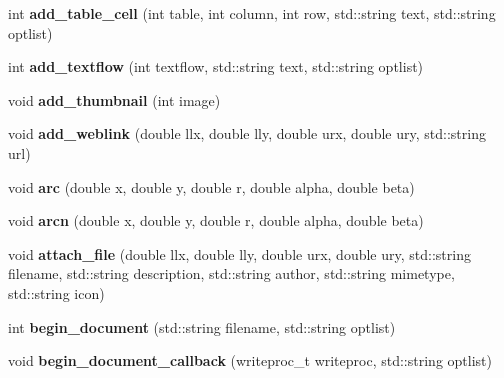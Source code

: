 \begin{DoxyCompactItemize}
\item 
\hypertarget{classPDFlib_a153ce04a9c160a24d13763f8ba6578fa}{int {\bfseries add\-\_\-table\-\_\-cell} (int table, int column, int row, std\-::string text, std\-::string optlist)}\label{classPDFlib_a153ce04a9c160a24d13763f8ba6578fa}

\item 
\hypertarget{classPDFlib_a44f52fd96b6152a2b4ae4f71cebcf36b}{int {\bfseries add\-\_\-textflow} (int textflow, std\-::string text, std\-::string optlist)}\label{classPDFlib_a44f52fd96b6152a2b4ae4f71cebcf36b}

\item 
\hypertarget{classPDFlib_a7561fadef64e392f98d047d5b6e79946}{void {\bfseries add\-\_\-thumbnail} (int image)}\label{classPDFlib_a7561fadef64e392f98d047d5b6e79946}

\item 
\hypertarget{classPDFlib_afdba46325698218399dda4b415204edd}{void {\bfseries add\-\_\-weblink} (double llx, double lly, double urx, double ury, std\-::string url)}\label{classPDFlib_afdba46325698218399dda4b415204edd}

\item 
\hypertarget{classPDFlib_aee884c54b243c01230926f493f06eaf9}{void {\bfseries arc} (double x, double y, double r, double alpha, double beta)}\label{classPDFlib_aee884c54b243c01230926f493f06eaf9}

\item 
\hypertarget{classPDFlib_a061eb6bb4e041c52547cf9d58416ddac}{void {\bfseries arcn} (double x, double y, double r, double alpha, double beta)}\label{classPDFlib_a061eb6bb4e041c52547cf9d58416ddac}

\item 
\hypertarget{classPDFlib_a911b3c91d2670200cdb3b78742fc6980}{void {\bfseries attach\-\_\-file} (double llx, double lly, double urx, double ury, std\-::string filename, std\-::string description, std\-::string author, std\-::string mimetype, std\-::string icon)}\label{classPDFlib_a911b3c91d2670200cdb3b78742fc6980}

\item 
\hypertarget{classPDFlib_aacb38db7f6eada3409fb616bd823e79f}{int {\bfseries begin\-\_\-document} (std\-::string filename, std\-::string optlist)}\label{classPDFlib_aacb38db7f6eada3409fb616bd823e79f}

\item 
\hypertarget{classPDFlib_a0c3289b502ca325c222c4df9c8318d1f}{void {\bfseries begin\-\_\-document\-\_\-callback} (writeproc\-\_\-t writeproc, std\-::string optlist)}\label{classPDFlib_a0c3289b502ca325c222c4df9c8318d1f}


\end{DoxyCompactItemize}
